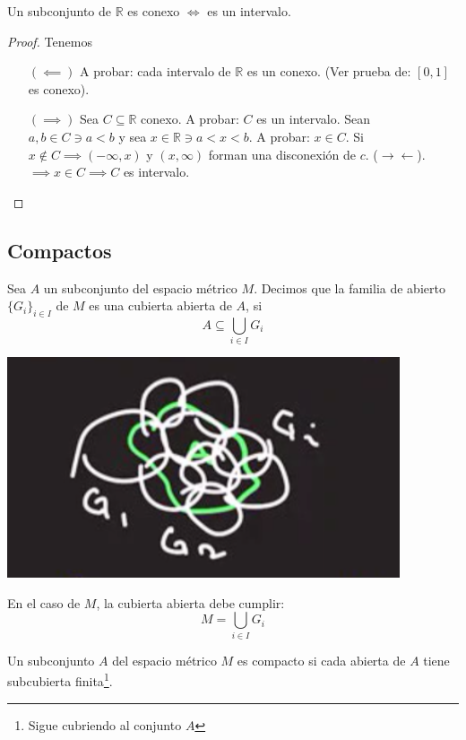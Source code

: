 \begin{teorema}
	Un subconjunto de $\mathbb{R}$ es conexo $\iff$ es un intervalo.
	\begin{proof}Tenemos
		\begin{enumerate}
			\item[$(\impliedby)$] A probar: cada intervalo de $\mathbb{R}$ es un conexo. (Ver prueba de: $[0,1]$ es conexo). 
			\item[$(\implies)$] Sea $C\subseteq \mathbb{R}$ conexo. A probar: $C$ es un intervalo. Sean $a,b\in C\ni a<b$ y sea $x\in\mathbb{R}\ni a<x<b$. A probar: $x\in C$. Si $x\not\in C\implies (-\infty,x)$ y $(x,\infty)$ forman una disconexión de $c$. ($\to\gets$). $\implies x\in C\implies C$ es intervalo.  
		\end{enumerate}
	\end{proof} 
\end{teorema}

\subsection{Compactos}

Sea $A$ un subconjunto del espacio métrico $M$. Decimos que la familia de abierto $\{G_i\}_{i\in I}$ de $M$ es una cubierta abierta de $A$, si 
$$A\subseteq \bigcup_{i\in I}G_i$$

\begin{center}
	\includegraphics[scale=0.4]{images/2/22}
\end{center}

\begin{nota}
	En el caso de $M$, la cubierta abierta debe cumplir: 
	$$M=\bigcup_{i\in I}G_i$$
\end{nota}

\begin{definicion}
	Un subconjunto $A$ del espacio métrico $M$ es compacto si cada abierta de $A$ tiene subcubierta finita\footnote{Sigue cubriendo al conjunto $A$}. 
\end{definicion}

